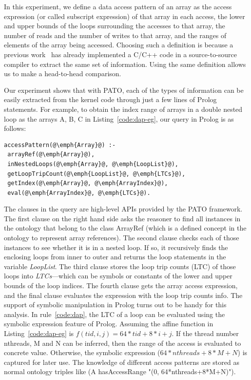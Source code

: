 In this experiment, we define a data access pattern of an array as the
access expression (or called subscript expression) of that array in
each access, the lower and upper bounds of the loops surrounding the
accesses to that array, the number of reads and the number of writes
to that array, and the ranges of elements of the array being
accessed. Choosing such a definition is because a previous
work~\cite{Chen2014} has already implemented a C/C++ code in a
source-to-source compiler to extract the same set of
information. Using the same definition allows us to make a
head-to-head comparison.

Our experiment shows that with PATO, each of the types of
information can be easily extracted from the kernel code through just
a few lines of Prolog statements. For example, to obtain the index
range of arrays in a double nested loop as the arrays \textsf{A, B, C}
in Listing~\ref{code:dap-eg}, our query in Prolog is as follows:

\begin{lstlisting}[xleftmargin=.1\columnwidth,
xrightmargin=.1\columnwidth,escapechar=@, 
caption=An example query for finding data access patterns, label=code:dap]
accessPattern(@\emph{Array}@) :-
 arrayRef(@\emph{Array}@),
 inNestedLoops(@\emph{Array}@, @\emph{LoopList}@),
 getLoopTripCount(@\emph{LoopList}@, @\emph{LTCs}@),
 getIndex(@\emph{Array}@, @\emph{ArrayIndex}@),
 eval(@\emph{ArrayIndex}@, @\emph{LTCs}@).
\end{lstlisting}

The clauses in the query are high-level APIs provided by the PATO
framework. The first clause on the right hand side asks the reasoner
to find all instances in the ontology that belong to the class
\textsf{ArrayRef} (which is a defined concept in the ontology to
represent array references). The second clause checks each of those
instances to see whether it is in a nested loop. If so, it recursively
finds the enclosing loops from inner to outer and returns the loop
statements in the variable {\em LoopList}. The third clause stores the
loop trip counts (LTC) of those loops into {\em LTCs}---which can be
symbols or constants of the lower and upper bounds of the loop
indices. The fourth clause gets the array access expression, and the
final clause evaluates the expression with the loop trip counts info.
The support of symbolic manipulation in Prolog turns out to be handy
for this analysis. In rule~\ref{code:dap}, the LTC of a loop can be
evaluated using the symbolic expression feature of Prolog.  Assuming
the affine function in Listing~\ref{code:dap-eg} is $f(tid, i, j) = 64
* tid + 8 * i + j$.  If the thread number \textsf{nthreads},
\textsf{M} and \textsf{N} can be inferred, then the range of the
access is evaluated to concrete value.  Otherwise, the symbolic
expression ($64 * nthreads + 8 * M + N$) is captured for later use.
The knowledge of different access patterns are stored as normal
ontology triples like \textsf{(A hasAccessRange "(0,
  64*nthreads+8*M+N)")}.


